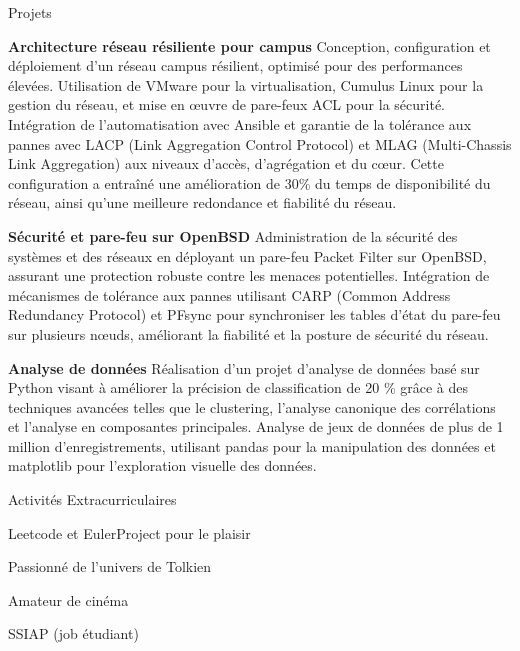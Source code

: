 \documentclass{resume}
\begin{document}
\begin{rSection}{Projets}
    \item \textbf{Architecture réseau résiliente pour campus} Conception, configuration et déploiement d'un réseau campus résilient, optimisé pour des performances élevées. Utilisation de VMware pour la virtualisation, Cumulus Linux pour la gestion du réseau, et mise en œuvre de pare-feux ACL pour la sécurité. Intégration de l'automatisation avec Ansible et garantie de la tolérance aux pannes avec LACP (Link Aggregation Control Protocol) et MLAG (Multi-Chassis Link Aggregation) aux niveaux d'accès, d'agrégation et du cœur. Cette configuration a entraîné une amélioration de 30\% du temps de disponibilité du réseau, ainsi qu'une meilleure redondance et fiabilité du réseau.
    
    \item \textbf{Sécurité et pare-feu sur OpenBSD} Administration de la sécurité des systèmes et des réseaux en déployant un pare-feu Packet Filter sur OpenBSD, assurant une protection robuste contre les menaces potentielles. Intégration de mécanismes de tolérance aux pannes utilisant CARP (Common Address Redundancy Protocol) et PFsync pour synchroniser les tables d'état du pare-feu sur plusieurs nœuds, améliorant la fiabilité et la posture de sécurité du réseau.
    
    \item \textbf{Analyse de données} Réalisation d'un projet d'analyse de données basé sur Python visant à améliorer la précision de classification de 20 \% grâce à des techniques avancées telles que le clustering, l'analyse canonique des corrélations et l'analyse en composantes principales. Analyse de jeux de données de plus de 1 million d'enregistrements, utilisant pandas pour la manipulation des données et matplotlib pour l'exploration visuelle des données.
\end{rSection} 
\begin{rSection}{Activités Extracurriculaires} 
    \begin{inparaenum}[|]
        \item Leetcode et EulerProject pour le plaisir
        \item Passionné de l'univers de Tolkien
        \item Amateur de cinéma
        \item SSIAP (job étudiant)
    \end{inparaenum}
\end{rSection}

\end{document}
